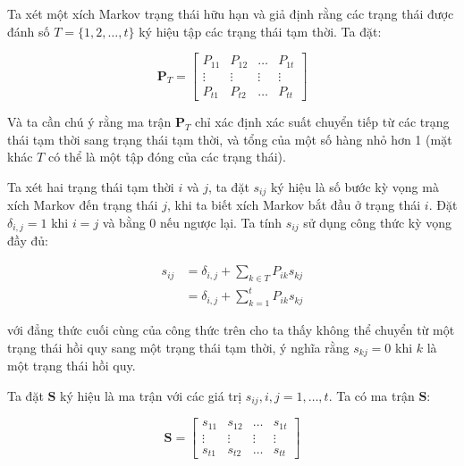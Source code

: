 \documentclass[14pt, a4paper]{article}
\numberwithin{equation}{section}
\numberwithin{figure}{section}
\theoremstyle{sltheorem}
\theoremstyle{soltheorem}
\numberwithin{dl}{section}
\numberwithin{vd}{section}
\begin{document}
    Ta xét một xích Markov trạng thái hữu hạn và giả định rằng các trạng thái được đánh số $T=\lbrace 1, 2, \dots, t \rbrace$ ký hiệu tập các trạng thái tạm thời.
    Ta đặt:

    \begin{equation*}
        \mathbf{P}_T = \begin{bmatrix} P_{11} & P_{12} & \dots & P_{1t} \\ \vdots & \vdots & \vdots & \vdots \\ P_{t1} & P_{t2} & \dots & P_{tt}  \end{bmatrix}
    \end{equation*}

    Và ta cần chú ý rằng ma trận $\mathbf{P}_T$ chỉ xác định xác suất chuyển tiếp từ các trạng thái tạm thời sang trạng thái tạm thời, và tổng của một số hàng nhỏ hơn 1 (mặt khác $T$ có thể là một tập đóng của các trạng thái).
    
    Ta xét hai trạng thái tạm thời $i$ và $j$, ta đặt $s_{ij}$ ký hiệu là số bước kỳ vọng mà xích Markov đến trạng thái $j$, khi ta biết xích Markov bắt đầu ở trạng thái $i$.
    Đặt $\delta_{i,j}=1$ khi $i=j$ và bằng 0 nếu ngược lại.
    Ta tính $s_{ij}$ sử dụng công thức kỳ vọng đầy đủ:

    \begin{equation} \label{eq:expected_number_periods_i_to_j}
        \begin{aligned}
            s_{ij} &= \delta_{i,j} + \sum_{k \in T} P_{ik}s_{kj} \\
            &= \delta_{i,j} + \sum_{k=1}^t P_{ik} s_{kj}
        \end{aligned}
    \end{equation}

    với đẳng thức cuối cùng của công thức trên cho ta thấy không thể chuyển từ một trạng thái hồi quy sang một trạng thái tạm thời, ý nghĩa rằng $s_{kj}=0$ khi $k$ là một trạng thái hồi quy.

    Ta đặt $\mathbf{S}$ ký hiệu là ma trận với các giá trị $s_{ij}, i, j = 1, \dots, t$. Ta có ma trận $\mathbf{S}$:

    \begin{equation*}
        \mathbf{S} = \begin{bmatrix} s_{11} & s_{12} & \dots & s_{1t} \\ \vdots & \vdots & \vdots & \vdots \\ s_{t1} & s_{t2} & \dots & s_{tt}  \end{bmatrix}
    \end{equation*}
\end{document}
